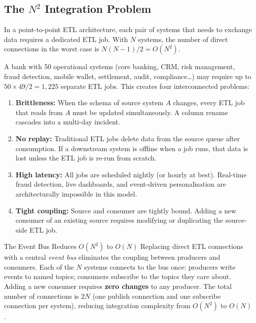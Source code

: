 \subsection{The $N^2$ Integration Problem}
\label{subsec:n2-problem}

In a point-to-point ETL architecture, each pair of systems that needs to
exchange data requires a dedicated ETL job. With $N$ systems, the number
of direct connections in the worst case is $N(N-1)/2 = O(N^2)$.

A bank with 50 operational systems (core banking, CRM, risk management,
fraud detection, mobile wallet, settlement, audit, compliance\ldots) may
require up to $50 \times 49 / 2 = 1{,}225$ separate ETL jobs. This
creates four interconnected problems:

\begin{enumerate}
  \item \textbf{Brittleness:} When the schema of source system $A$
        changes, every ETL job that reads from $A$ must be updated
        simultaneously. A column rename cascades into a multi-day
        incident.
  \item \textbf{No replay:} Traditional ETL jobs delete data from the
        source queue after consumption. If a downstream system is
        offline when a job runs, that data is lost unless the ETL
        job is re-run from scratch.
  \item \textbf{High latency:} All jobs are scheduled nightly (or
        hourly at best). Real-time fraud detection, live dashboards,
        and event-driven personalisation are architecturally impossible
        in this model.
  \item \textbf{Tight coupling:} Source and consumer are tightly bound.
        Adding a new consumer of an existing source requires modifying
        or duplicating the source-side ETL job.
\end{enumerate}

\begin{keyinsight}{The Event Bus Reduces $O(N^2)$ to $O(N)$}
Replacing direct ETL connections with a central \emph{event bus}
eliminates the coupling between producers and consumers. Each of the
$N$ systems connects to the bus once: producers write events to named
topics; consumers subscribe to the topics they care about. Adding a
new consumer requires \textbf{zero changes} to any producer. The total
number of connections is $2N$ (one publish connection and one subscribe
connection per system), reducing integration complexity from $O(N^2)$
to $O(N)$.
\end{keyinsight}

